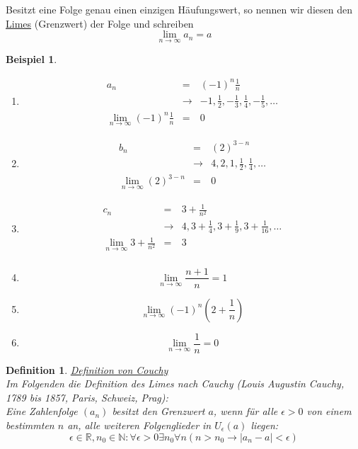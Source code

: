 \documentclass{report}
\newtheorem{mydef}{Definition}
\newtheorem{myexample}{Beispiel}
\begin{document}
\noindent
Besitzt eine Folge genau einen einzigen Häufungswert, so nennen wir diesen den \underline{Limes} (Grenzwert) der Folge und schreiben
\begin{equation*}\boxed{\lim_{n \to \infty}a_n = a }\end{equation*}
\begin{myexample}
\begin{enumerate}
\item
	\begin{eqnarray*}
		a_n &=& (-1)^n\frac{1}{n}\\
		&\rightarrow& -1, \frac{1}{2}, -\frac{1}{3}, \frac{1}{4}, -\frac{1}{5}, \ldots\\
		\lim_{n \to \infty}(-1)^n\frac{1}{n} &=& 0 
	\end{eqnarray*}
\item
	\begin{eqnarray*}
		b_n &=& (2)^{3-n}\\
		&\rightarrow& 4,2,1,\frac{1}{2},\frac{1}{4}, \ldots\\
		\lim_{n \to \infty}(2)^{3-n} &=& 0 
	\end{eqnarray*}
\item
	\begin{eqnarray*}
		c_n &=& 3+\frac{1}{n^2}\\
		&\rightarrow& 4,3+\frac{1}{4},3+\frac{1}{9},3+\frac{1}{16}, \ldots\\
		\lim_{n \to \infty}3+\frac{1}{n^2} &=& 3\\ 
	\end{eqnarray*} 
\item
	\begin{equation*}\lim_{n \to \infty}\frac{n+1}{n}=1\end{equation*}
\item 
	\begin{equation*}\lim_{n \to \infty}(-1)^n(2+\frac{1}{n})\end{equation*}
\item 
	\begin{equation*}\lim_{n \to \infty}\frac{1}{n}=0\end{equation*}
\end{enumerate}
\end{myexample}
\begin{mydef}\underline{Definition von Couchy}\\Im Folgenden die Definition des Limes nach Cauchy (Louis Augustin Cauchy, 1789 bis 1857, Paris, Schweiz, Prag):\\
Eine Zahlenfolge $(a_n)$ besitzt den Grenzwert $a$, wenn für alle $\epsilon > 0$ von einem bestimmten $n$ an, alle weiteren Folgenglieder in $U_\epsilon(a)$ liegen:
\begin{equation*}\epsilon \in \mathbb{R}, n_0 \in \mathbb{N}: \forall \epsilon > 0\exists n_0 \forall n (n > n_0 \to |a_n-a| < \epsilon)\end{equation*}\end{mydef}
\end{document}

